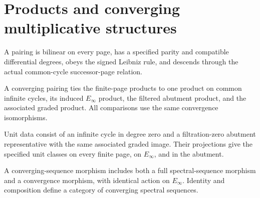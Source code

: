 \section{Products and converging multiplicative structures}

\begin{definition}
\label{sem:SpectralSequence:pairing}
A pairing is bilinear on every page, has a specified parity and compatible differential degrees, obeys the signed Leibniz rule, and descends through the actual common-cycle successor-page relation.
\end{definition}

\begin{definition}
\label{sem:SpectralSequence:converging-pairing}
A converging pairing ties the finite-page products to one product on common infinite cycles, its induced $E_\infty$ product, the filtered abutment product, and the associated graded product. All comparisons use the same convergence isomorphisms.
\end{definition}

\begin{definition}
\label{sem:SpectralSequence:unit}
Unit data consist of an infinite cycle in degree zero and a filtration-zero abutment representative with the same associated graded image. Their projections give the specified unit classes on every finite page, on $E_\infty$, and in the abutment.
\end{definition}

\begin{definition}
\label{sem:SpectralSequence:converging-category}
A converging-sequence morphism includes both a full spectral-sequence morphism and a convergence morphism, with identical action on $E_\infty$. Identity and composition define a category of converging spectral sequences.
\end{definition}
